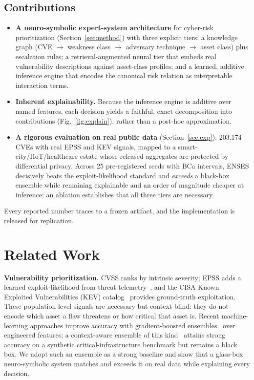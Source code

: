 \documentclass[review,3p,times]{elsarticle}
\begin{document}
\subsection{Contributions}
\label{sec:contrib}
\begin{itemize}
\item \textbf{A neuro-symbolic expert-system architecture} for cyber-risk
prioritization (Section~\ref{sec:method}) with three explicit tiers: a
knowledge graph (CVE $\rightarrow$ weakness class $\rightarrow$ adversary
technique $\rightarrow$ asset class) plus escalation rules; a
retrieval-augmented neural tier that embeds real vulnerability descriptions
against asset-class profiles; and a learned, additive inference engine that
encodes the canonical risk relation as interpretable interaction terms.
\item \textbf{Inherent explainability.} Because the inference engine is additive
over named features, each decision yields a faithful, exact decomposition into
contributions (Fig.~\ref{fig:explain}), rather than a post-hoc approximation.
\item \textbf{A rigorous evaluation on real public data}
(Section~\ref{sec:exp}): 203{,}174 CVEs with real EPSS and KEV signals, mapped
to a smart-city/IIoT/healthcare estate whose released aggregates are protected
by differential privacy. Across 25 pre-registered seeds with BCa intervals,
ENSES decisively beats the exploit-likelihood standard and \emph{exceeds} a
black-box ensemble while remaining explainable and an order of magnitude
cheaper at inference; an ablation establishes that all three tiers are
necessary.
\end{itemize}
Every reported number traces to a frozen artifact, and the implementation is
released for replication.

\section{Related Work}
\label{sec:related}
\textbf{Vulnerability prioritization.} CVSS ranks by intrinsic severity; EPSS
adds a learned exploit-likelihood from threat telemetry~\cite{jacobs2021epss},
and the CISA Known Exploited Vulnerabilities (KEV) catalog~\cite{cisa2021kev}
provides ground-truth exploitation. These population-level signals are
necessary but context-blind: they do not encode which asset a flaw threatens or
how critical that asset is. Recent machine-learning approaches improve accuracy
with gradient-boosted ensembles~\cite{chen2016xgboost} over engineered features;
a context-aware ensemble of this kind~\cite{malla2026ensemble} attains strong
accuracy on a synthetic critical-infrastructure benchmark but remains a black
box. We adopt such an ensemble as a strong baseline and show that a glass-box
neuro-symbolic system matches and exceeds it on real data while explaining every
decision.
\end{document}
